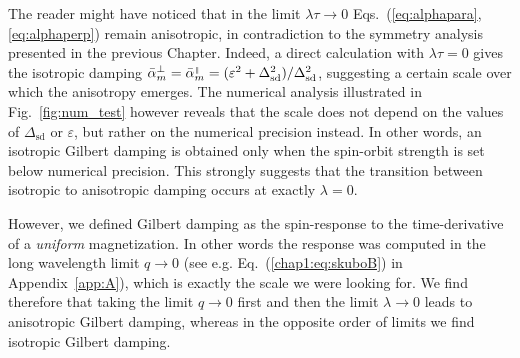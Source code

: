 

The reader might have noticed that in the limit $\lambda\tau\rightarrow0$ Eqs.~(\ref{eq:alphapara},\ref{eq:alphaperp}) remain anisotropic, in contradiction to the symmetry analysis presented in the previous Chapter. Indeed, a direct calculation with $\lambda\tau=0$ gives the isotropic damping $\bar{\alpha}_m^{\perp}=\bar{\alpha}_m^{{\scriptscriptstyle\parallel}}=(\varepsilon^2+\Delta_\text{sd}^2)/\Delta_\text{sd}^2$, suggesting a certain scale over which the anisotropy emerges. The numerical analysis illustrated in Fig.~\ref{fig:num_test} however reveals that the scale does not depend on the values of $\Delta_\text{sd}$ or $\varepsilon$, but rather on the numerical precision instead. In other words, an isotropic Gilbert damping is obtained only when the spin-orbit strength is set below numerical precision. This strongly suggests that the transition between isotropic to anisotropic damping occurs at exactly $\lambda=0$. 

However, we defined Gilbert damping as the spin-response to the time-derivative of a \emph{uniform} magnetization. In other words the response was computed in the long wavelength limit $q\rightarrow0$ (see e.g. Eq.~(\ref{chap1:eq:skuboB}) in Appendix~\ref{app:A}), which is exactly the scale we were looking for. We find therefore that taking the limit $q\rightarrow0$ first and then the limit $\lambda\rightarrow0$ leads to anisotropic Gilbert damping, whereas in the opposite order of limits we find isotropic Gilbert damping.  

